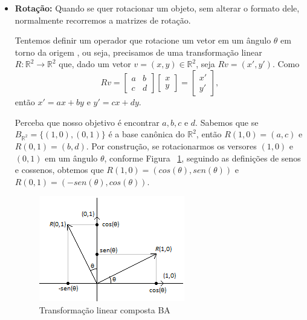 \documentclass[a4paper,12pt]{article}
\begin{document}
\begin{itemize}
	 	
	 	\item \textbf{Rotação:} Quando se quer rotacionar um objeto, sem alterar o formato dele, normalmente recorremos a matrizes de rotação.
	 	
	 	Tentemos definir um operador que rotacione um vetor em um ângulo $\theta$  em torno da origem \cite{AlgebraLinearElon}, ou seja, precisamos de uma transformação linear $R: \mathbb{R}^2 \longrightarrow \mathbb{R}^2$ que, dado um vetor $v = (x,y) \in \mathbb{R}^2$, seja $Rv = (x', y')$. Como
	 	$$
	 	Rv = 
	 	\begin{bmatrix}
	 	a & b\\
	 	c & d
	 	\end{bmatrix}
	 	\begin{bmatrix}
	 	x\\
	 	y
	 	\end{bmatrix}
	 	=
	 	\begin{bmatrix}
	 	x'\\
	 	y'
	 	\end{bmatrix},
	 	$$
		então $x' = ax + by$ e $y' = cx + dy$. 
		
		Perceba que nosso objetivo é encontrar $a,b,c$ e $d$.
		Sabemos que se $B_{\mathbb{R}^2} = \{(1,0),(0,1)\}$ é a base canônica do $\mathbb{R}^2$, então $R(1,0) = (a,c)$ e $R(0,1) = (b,d)$. Por construção, se rotacionarmos os versores $(1,0)$ e $(0,1)$ em um ângulo $\theta$, conforme Figura ~\ref{fig:rota}, seguindo as definições de senos e cossenos, obtemos que $R(1,0) = (cos(\theta), sen(\theta))$ e $R(0,1) = (-sen(\theta), cos(\theta))$.
		
		\begin{figure}[H]
			\begin{center}
				\includegraphics[width=0.5\linewidth]{rota.png}
			\end{center}
			\caption{Transformação linear composta BA}
			\label{fig:rota}
		\end{figure}
	 

\end{itemize}
\end{document}
